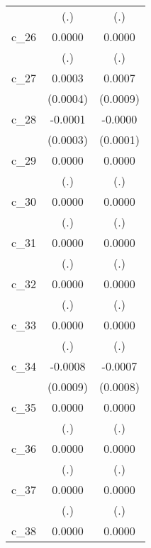 {\begin{tabular}{l*{2}{c}}
            &         (.)        &         (.)        \\
[1em]
c\_26        &      0.0000        &      0.0000        \\
            &         (.)        &         (.)        \\
[1em]
c\_27        &      0.0003        &      0.0007        \\
            &    (0.0004)        &    (0.0009)        \\
[1em]
c\_28        &     -0.0001        &     -0.0000        \\
            &    (0.0003)        &    (0.0001)        \\
[1em]
c\_29        &      0.0000        &      0.0000        \\
            &         (.)        &         (.)        \\
[1em]
c\_30        &      0.0000        &      0.0000        \\
            &         (.)        &         (.)        \\
[1em]
c\_31        &      0.0000        &      0.0000        \\
            &         (.)        &         (.)        \\
[1em]
c\_32        &      0.0000        &      0.0000        \\
            &         (.)        &         (.)        \\
[1em]
c\_33        &      0.0000        &      0.0000        \\
            &         (.)        &         (.)        \\
[1em]
c\_34        &     -0.0008        &     -0.0007        \\
            &    (0.0009)        &    (0.0008)        \\
[1em]
c\_35        &      0.0000        &      0.0000        \\
            &         (.)        &         (.)        \\
[1em]
c\_36        &      0.0000        &      0.0000        \\
            &         (.)        &         (.)        \\
[1em]
c\_37        &      0.0000        &      0.0000        \\
            &         (.)        &         (.)        \\
[1em]
c\_38        &      0.0000        &      0.0000        \\

\end{tabular}}
